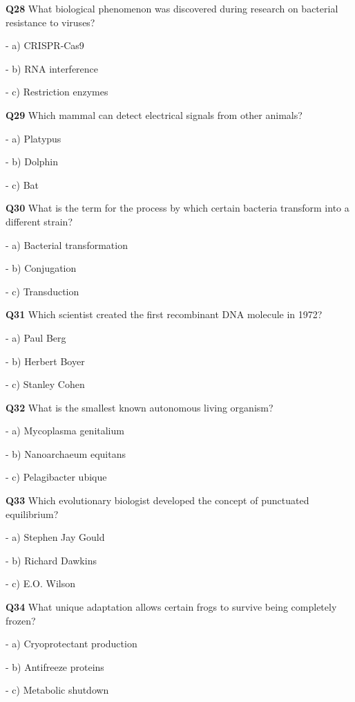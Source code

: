 \textbf{Q28} What biological phenomenon was discovered during research on bacterial resistance to viruses?\par
\quad - a) CRISPR‑Cas9\par
\quad - b) RNA interference\par
\quad - c) Restriction enzymes\par

\textbf{Q29} Which mammal can detect electrical signals from other animals?\par
\quad - a) Platypus\par
\quad - b) Dolphin\par
\quad - c) Bat\par

\textbf{Q30} What is the term for the process by which certain bacteria transform into a different strain?\par
\quad - a) Bacterial transformation\par
\quad - b) Conjugation\par
\quad - c) Transduction\par

\textbf{Q31} Which scientist created the first recombinant DNA molecule in 1972?\par
\quad - a) Paul Berg\par
\quad - b) Herbert Boyer\par
\quad - c) Stanley Cohen\par

\textbf{Q32} What is the smallest known autonomous living organism?\par
\quad - a) Mycoplasma genitalium\par
\quad - b) Nanoarchaeum equitans\par
\quad - c) Pelagibacter ubique\par

\textbf{Q33} Which evolutionary biologist developed the concept of punctuated equilibrium?\par
\quad - a) Stephen Jay Gould\par
\quad - b) Richard Dawkins\par
\quad - c) E.O. Wilson\par

\textbf{Q34} What unique adaptation allows certain frogs to survive being completely frozen?\par
\quad - a) Cryoprotectant production\par
\quad - b) Antifreeze proteins\par
\quad - c) Metabolic shutdown\par

